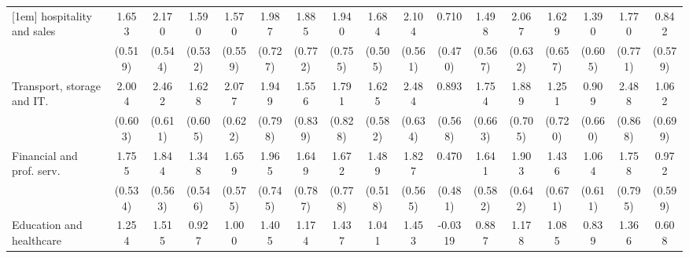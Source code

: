 {\begin{tabular}{l*{16}{c}}
[1em]
hospitality and sales&       1.653\sym{**} &       2.170\sym{***}&       1.590\sym{**} &       1.570\sym{**} &       1.987\sym{**} &       1.885\sym{*}  &       1.940\sym{*}  &       1.684\sym{***}&       2.104\sym{***}&       0.710         &       1.498\sym{**} &       2.067\sym{**} &       1.629\sym{*}  &       1.390\sym{*}  &       1.770\sym{*}  &       0.842         \\
                    &     (0.519)         &     (0.544)         &     (0.532)         &     (0.559)         &     (0.727)         &     (0.772)         &     (0.755)         &     (0.505)         &     (0.561)         &     (0.470)         &     (0.567)         &     (0.632)         &     (0.657)         &     (0.605)         &     (0.771)         &     (0.579)         \\
[1em]
Transport, storage and IT.&       2.004\sym{***}&       2.462\sym{***}&       1.628\sym{**} &       2.077\sym{***}&       1.949\sym{*}  &       1.556         &       1.791\sym{*}  &       1.625\sym{**} &       2.484\sym{***}&       0.893         &       1.754\sym{**} &       1.889\sym{**} &       1.251         &       0.909         &       2.488\sym{**} &       1.062         \\
                    &     (0.603)         &     (0.611)         &     (0.605)         &     (0.622)         &     (0.798)         &     (0.839)         &     (0.828)         &     (0.582)         &     (0.634)         &     (0.568)         &     (0.663)         &     (0.705)         &     (0.720)         &     (0.660)         &     (0.868)         &     (0.699)         \\
[1em]
Financial and prof. serv.&       1.755\sym{**} &       1.844\sym{**} &       1.348\sym{*}  &       1.659\sym{**} &       1.965\sym{**} &       1.649\sym{*}  &       1.672\sym{*}  &       1.489\sym{**} &       1.827\sym{**} &       0.470         &       1.641\sym{**} &       1.903\sym{**} &       1.436\sym{*}  &       1.064         &       1.758\sym{*}  &       0.972         \\
                    &     (0.534)         &     (0.563)         &     (0.546)         &     (0.575)         &     (0.745)         &     (0.787)         &     (0.778)         &     (0.518)         &     (0.565)         &     (0.481)         &     (0.582)         &     (0.642)         &     (0.671)         &     (0.611)         &     (0.795)         &     (0.599)         \\
[1em]
Education and healthcare&       1.254\sym{*}  &       1.515\sym{**} &       0.927         &       1.000         &       1.405         &       1.174         &       1.437         &       1.041\sym{*}  &       1.453\sym{*}  &     -0.0319         &       0.887         &       1.178         &       1.085         &       0.839         &       1.366         &       0.608         \\

\end{tabular}}
